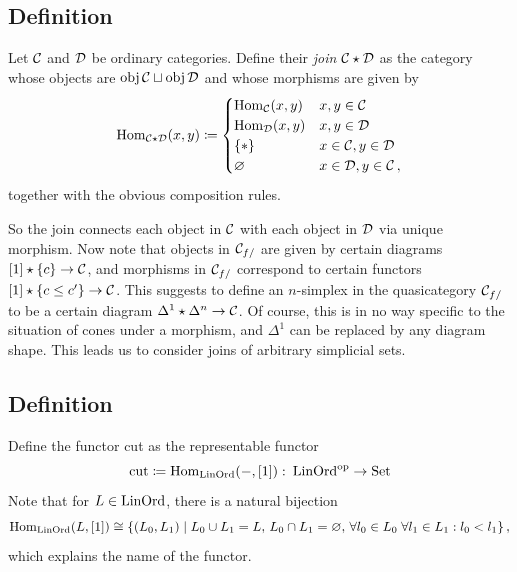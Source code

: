     \subsection{Definition}\label{chVI-3-1}
        Let $\mathcal{C}$ and $\mathcal{D}$ be ordinary categories. Define their \emph{join} $\mathcal{C} \star \mathcal{D}$ as the category whose objects are $\operatorname{obj} \mathcal{C} \sqcup \operatorname{obj} \mathcal{D}$ and whose morphisms are given by
        \begin{equation*}
            \operatorname{Hom}_{\mathcal{C} \star \mathcal{D}}(x, y) \coloneq
            \begin{cases}
                \operatorname{Hom}_{\mathcal{C}}(x, y) & x, y \in \mathcal{C} \\
                \operatorname{Hom}_{\mathcal{D}}(x, y) & x, y \in \mathcal{D} \\
                \{*\} & x \in \mathcal{C}, y \in \mathcal{D} \\
                \varnothing & x \in \mathcal{D}, y \in \mathcal{C} \,,
            \end{cases}
        \end{equation*}
        together with the obvious composition rules.
        \medskip

        So the join connects each object in $\mathcal{C}$ with each object in $\mathcal{D}$ via unique morphism. Now note that objects in $\mathcal{C}_{f/}$ are given by certain diagrams $[1] \star \{c\} \to \mathcal{C}$, and morphisms in $\mathcal{C}_{f/}$ correspond to certain functors $[1] \star \{c \leq c'\} \to \mathcal{C}$. This suggests to define an $n$-simplex in the quasicategory $\mathcal{C}_{f/}$ to be a certain diagram $\Delta^1 \star \Delta^n \to \mathcal{C}$. Of course, this is in no way specific to the situation of cones under a morphism, and $\Delta^1$ can be replaced by any diagram shape. This leads us to consider joins of arbitrary simplicial sets.

    \subsection{Definition}\label{chVI-3-2}
        Define the functor cut as the representable functor
        \begin{equation*}
            \operatorname{cut} \coloneq \operatorname{Hom}_{\operatorname{LinOrd}}(-, [1]) \,\colon \operatorname{LinOrd}^{\operatorname{op}} \to \operatorname{Set}
        \end{equation*}
        Note that for $L \in \operatorname{LinOrd}$, there is a natural bijection
        \begin{equation*}
            \operatorname{Hom}_{\operatorname{LinOrd}}(L, [1]) \cong \{(L_0, L_1) \mid L_0 \cup L_1 = L,\, L_0 \cap L_1 = \varnothing,\, \forall l_0 \in L_0 \; \forall l_1 \in L_1 : l_0 < l_1 \} \,,
        \end{equation*}
        which explains the name of the functor.

